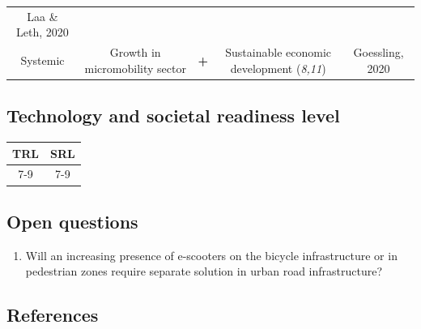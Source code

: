 \documentclass[
]{book}
\providecommand{\tightlist}{%
  \setlength{\itemsep}{0pt}\setlength{\parskip}{0pt}}
\begin{document}
\begin{longtable}[]{@{}ccccc@{}}
\begin{minipage}[t]{0.17\columnwidth}
Laa \& Leth, 2020\strut
\end{minipage}\tabularnewline
\begin{minipage}[t]{0.17\columnwidth}\centering
Systemic\strut
\end{minipage} & \begin{minipage}[t]{0.16\columnwidth}\centering
Growth in micromobility sector\strut
\end{minipage} & \begin{minipage}[t]{0.17\columnwidth}\centering
\textbf{+}\strut
\end{minipage} & \begin{minipage}[t]{0.17\columnwidth}\centering
Sustainable economic development (\emph{8,11})\strut
\end{minipage} & \begin{minipage}[t]{0.17\columnwidth}\centering
Goessling, 2020\strut
\end{minipage}\tabularnewline
\bottomrule
\end{longtable}

\hypertarget{technology-and-societal-readiness-level-44}{%
\subsection*{Technology and societal readiness level}\label{technology-and-societal-readiness-level-44}}

\begin{longtable}[]{@{}cc@{}}
\toprule
TRL & SRL\tabularnewline
\midrule
\endhead
7-9 & 7-9\tabularnewline
\bottomrule
\end{longtable}

\hypertarget{open-questions-44}{%
\subsection*{Open questions}\label{open-questions-44}}

\begin{enumerate}
\def\labelenumi{\arabic{enumi}.}
\tightlist
\item
  Will an increasing presence of e-scooters on the bicycle infrastructure or in pedestrian zones require separate solution in urban road infrastructure?
\end{enumerate}

\hypertarget{references-44}{%
\subsection*{References}\label{references-44}}
\end{document}
